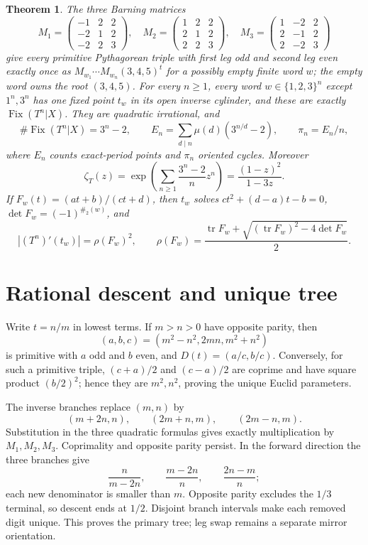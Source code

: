 \documentclass[10pt]{article}
\newtheorem{theorem}{Theorem}
\newcommand{\Fix}{\operatorname{Fix}}
\begin{document}
\begin{theorem}\label{thm:main}
The three Barning matrices
\[
M_1=\begin{pmatrix}-1&2&2\\-2&1&2\\-2&2&3\end{pmatrix},\quad
M_2=\begin{pmatrix}1&2&2\\2&1&2\\2&2&3\end{pmatrix},\quad
M_3=\begin{pmatrix}1&-2&2\\2&-1&2\\2&-2&3\end{pmatrix}
\]
give every primitive Pythagorean triple with first leg odd and second leg even
exactly once as $M_{w_1}\cdots M_{w_n}(3,4,5)^t$ for a possibly empty
finite word $w$; the empty word owns the root $(3,4,5)$.
For every $n\ge1$, every word $w\in\{1,2,3\}^n$ except $1^n,3^n$ has one
fixed point $t_w$ in its open inverse cylinder, and these are exactly
$\Fix(T^n|X)$.  They are quadratic irrational, and
\[
 \#\Fix(T^n|X)=3^n-2,\qquad
 E_n=\sum_{d\mid n}\mu(d)(3^{n/d}-2),\qquad \pi_n=E_n/n,
\]
where $E_n$ counts exact-period points and $\pi_n$ oriented cycles.  Moreover
\[
 \zeta_T(z)=\exp\!\left(\sum_{n\ge1}\frac{3^n-2}{n}z^n\right)
 =\frac{(1-z)^2}{1-3z}.
\]
If $F_w(t)=(at+b)/(ct+d)$, then $t_w$ solves
$ct^2+(d-a)t-b=0$, $\det F_w=(-1)^{\#_2(w)}$, and
\[
 |(T^n)'(t_w)|=\rho(F_w)^2,\qquad
 \rho(F_w)=\frac{\operatorname{tr}F_w+
 \sqrt{(\operatorname{tr}F_w)^2-4\det F_w}}2.
\]
\end{theorem}

\section{Rational descent and unique tree}
Write $t=n/m$ in lowest terms.  If $m>n>0$ have opposite parity, then
\[
 (a,b,c)=(m^2-n^2,2mn,m^2+n^2)
\]
is primitive with $a$ odd and $b$ even, and $D(t)=(a/c,b/c)$.  Conversely,
for such a primitive triple, $(c+a)/2$ and $(c-a)/2$ are coprime and have
square product $(b/2)^2$; hence they are $m^2,n^2$, proving the unique Euclid
parameters.

The inverse branches replace $(m,n)$ by
\[
 (m+2n,n),\qquad(2m+n,m),\qquad(2m-n,m).
\]
Substitution in the three quadratic formulas gives exactly multiplication by
$M_1,M_2,M_3$.  Coprimality and opposite parity persist.  In the forward
direction the three branches give
\[
 \frac n{m-2n},\qquad\frac{m-2n}{n},\qquad\frac{2n-m}{n};
\]
each new denominator is smaller than $m$.  Opposite parity excludes the
$1/3$ terminal, so descent ends at $1/2$.  Disjoint branch intervals make each
removed digit unique.  This proves the primary tree; leg swap remains a
separate mirror orientation.
\end{document}
